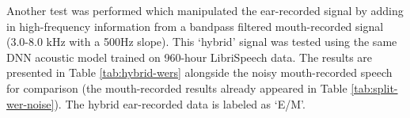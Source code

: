 % 
% 


Another test was performed which manipulated the ear-recorded signal by adding in high-frequency information from a bandpass filtered mouth-recorded signal (3.0-8.0 kHz with a 500Hz slope).  This `hybrid' signal was tested using the same DNN acoustic model trained on 960-hour LibriSpeech data.  The results are presented in Table \ref{tab:hybrid-wers} alongside the noisy mouth-recorded speech for comparison (the mouth-recorded results already appeared in Table \ref{tab:split-wer-noise}).  The hybrid ear-recorded data is labeled as `E/M'.

